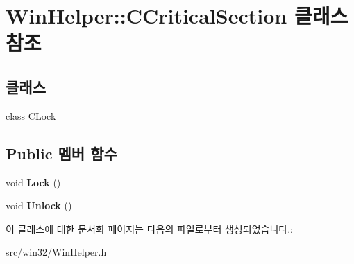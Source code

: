 \hypertarget{class_win_helper_1_1_c_critical_section}{}\section{Win\+Helper\+:\+:C\+Critical\+Section 클래스 참조}
\label{class_win_helper_1_1_c_critical_section}
\subsection*{클래스}
\begin{DoxyCompactItemize}
\item 
class \mbox{\hyperlink{class_win_helper_1_1_c_critical_section_1_1_c_lock}{C\+Lock}}
\end{DoxyCompactItemize}
\subsection*{Public 멤버 함수}
\begin{DoxyCompactItemize}
\item 
\mbox{\label{class_win_helper_1_1_c_critical_section_aa0c20ee0e7de698b37c26a295d0f45fe}} 
void {\bfseries Lock} ()
\item 
\mbox{\label{class_win_helper_1_1_c_critical_section_a32b6fc61701020c400f3bb9b5e00bf12}} 
void {\bfseries Unlock} ()
\end{DoxyCompactItemize}


이 클래스에 대한 문서화 페이지는 다음의 파일로부터 생성되었습니다.\+:\begin{DoxyCompactItemize}
\item 
src/win32/Win\+Helper.\+h\end{DoxyCompactItemize}
